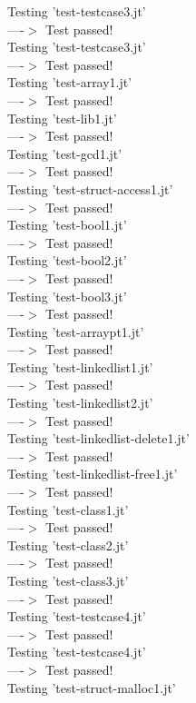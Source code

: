 \documentclass{article}
\begin{document}
Testing 'test-testcase3.jt'\\
  ----$>$  Test passed!\\
Testing 'test-testcase3.jt'\\
  ----$>$  Test passed!\\
Testing 'test-array1.jt'\\
  ----$>$  Test passed!\\
Testing 'test-lib1.jt'\\
  ----$>$  Test passed!\\
Testing 'test-gcd1.jt'\\
  ----$>$  Test passed!\\
Testing 'test-struct-access1.jt'\\
  ----$>$  Test passed!\\
Testing 'test-bool1.jt'\\
  ----$>$  Test passed!\\
Testing 'test-bool2.jt'\\
  ----$>$  Test passed!\\
Testing 'test-bool3.jt'\\
  ----$>$  Test passed!\\
Testing 'test-arraypt1.jt'\\
  ----$>$  Test passed!\\
Testing 'test-linkedlist1.jt'\\
  ----$>$  Test passed!\\
Testing 'test-linkedlist2.jt'\\
  ----$>$  Test passed!\\
Testing 'test-linkedlist-delete1.jt'\\
  ----$>$  Test passed!\\
Testing 'test-linkedlist-free1.jt'\\
  ----$>$  Test passed!\\
Testing 'test-class1.jt'\\
  ----$>$  Test passed!\\
Testing 'test-class2.jt'\\
  ----$>$  Test passed!\\
Testing 'test-class3.jt'\\
  ----$>$  Test passed!\\
Testing 'test-testcase4.jt'\\
  ----$>$  Test passed!\\
Testing 'test-testcase4.jt'\\
  ----$>$  Test passed!\\
Testing 'test-struct-malloc1.jt'\\
\end{document}
